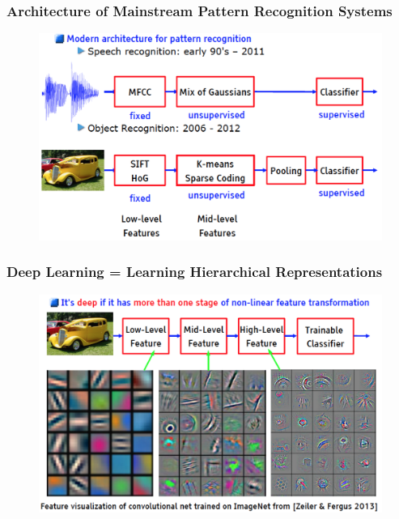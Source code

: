 \documentclass{beamer}
\begin{document}
\begin{frame}
\frametitle{Architecture of Mainstream Pattern Recognition Systems}
\begin{figure}
      \includegraphics[width=1\textwidth]{figs/intro2.png}
\end{figure}
\end{frame}

\begin{frame}
\frametitle{Deep Learning = Learning Hierarchical Representations}
\begin{figure}
      \includegraphics[width=1\textwidth]{figs/intro3.png}
\end{figure}
\end{frame}
\end{document}
